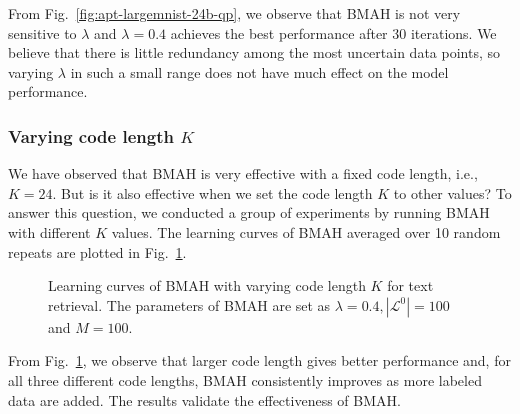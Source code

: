 From Fig.~\ref{fig:apt-largemnist-24b-qp}, we observe that \mbox{BMAH} is not very sensitive to $\lambda$ and $\lambda=0.4$ achieves the best performance after 30 iterations. We believe that  there is little redundancy among the most uncertain data points, so varying $\lambda$ in such a small range does not have much effect on the model performance.
\subsubsection{Varying code length $K$}

We have observed that \mbox{BMAH} is very effective with a fixed code length, i.e., $ K=24 $. But is it also effective when we set the code length $ K $ to other values? To answer this question, we conducted a group of experiments by running \mbox{BMAH} with different $ K $ values. The learning curves of \mbox{BMAH} averaged over 10 random repeats are plotted in Fig.~\ref{fig:apt-largemnist-fullb}. %

\begin{figure}[htb]
{}
\caption{Learning curves of \mbox{BMAH} with varying code length $K$ for text retrieval. The parameters of \mbox{BMAH} are set as $\lambda=0.4,|\mathcal{L}^{0}|=100$ and $M = 100$.}
\label{fig:apt-largemnist-fullb}
\end{figure}

From Fig.~\ref{fig:apt-largemnist-fullb}, we observe that larger code length gives better performance and, for all three different code lengths, \mbox{BMAH} consistently improves as more labeled data are added. The results validate the effectiveness of \mbox{BMAH}.

